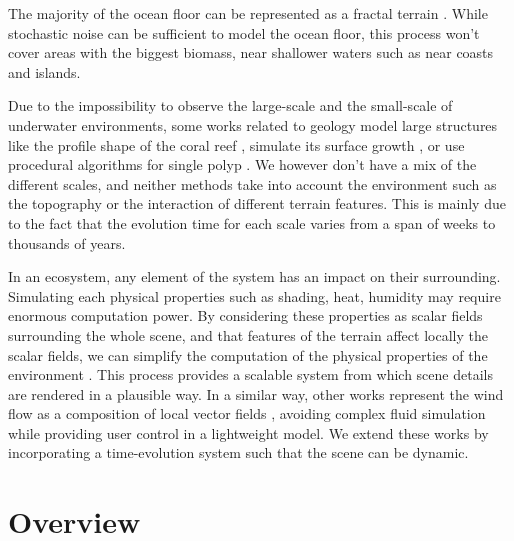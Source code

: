 The majority of the ocean floor can be represented as a fractal terrain \cite{Mareschal1989}. While stochastic noise can be sufficient to model the ocean floor, this process won't cover areas with the biggest biomass, near shallower waters such as near coasts and islands.

Due to the impossibility to observe the large-scale and the small-scale of underwater environments, some works related to geology model large structures like the profile shape of the coral reef \cite{Bosscher1992}, simulate its surface growth \cite{Li2021}, or use procedural algorithms for single polyp \cite{Abela2015}. We however don't have a mix of the different scales, and neither methods take into account the environment such as the topography or the interaction of different terrain features. This is mainly due to the fact that the evolution time for each scale varies from a span of weeks to thousands of years.

In an ecosystem, any element of the system has an impact on their surrounding. Simulating each physical properties such as shading, heat, humidity may require enormous computation power. By considering these properties as scalar fields surrounding the whole scene, and that features of the terrain affect locally the scalar fields, we can simplify the computation of the physical properties of the environment \cite{Grosbellet2016, Guerin2016a}. This process provides a scalable system from which scene details are rendered in a plausible way. In a similar way, other works represent the wind flow as a composition of local vector fields \cite{Wejchert1991}, avoiding complex fluid simulation while providing user control in a lightweight model. We extend these works by incorporating a time-evolution system such that the scene can be dynamic.


\section{Overview}
\label{sec:semantic-representation_pipeline}

